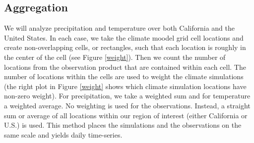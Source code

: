 \subsection{Aggregation}
\label{aggregate}


We will analyze precipitation and temperature over both California and the United States. In each case, we take the climate moodel grid cell locations and create non-overlapping cells, or rectangles, such that each location is roughly in the center of the cell (see Figure \ref{weight}). Then we count the number of locations from the observation product that are contained within each cell. The number of locations within the cells are used to weight the climate simulations (the right plot in Figure \ref{weight} shows which climate simulation locations have non-zero weight). For precipitation, we take a weighted sum and for temperature a weighted average. No weighting is used for the observations. Instead, a straight sum or average of all locations within our region of interest (either California or U.S.) is used. This method places the simulations and the observations on the same scale and yields daily time-series.

